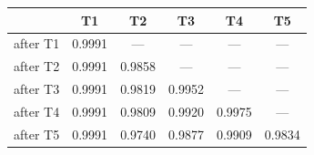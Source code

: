 \begin{tabular}{@{}lccccc@{}}
\toprule
& \textbf{T1} & \textbf{T2} & \textbf{T3} & \textbf{T4} & \textbf{T5} \\
\midrule
after T1 & 0.9991 & --- & --- & --- & --- \\
after T2 & 0.9991 & 0.9858 & --- & --- & --- \\
after T3 & 0.9991 & 0.9819 & 0.9952 & --- & --- \\
after T4 & 0.9991 & 0.9809 & 0.9920 & 0.9975 & --- \\
after T5 & 0.9991 & 0.9740 & 0.9877 & 0.9909 & 0.9834 \\
\bottomrule
\end{tabular}
